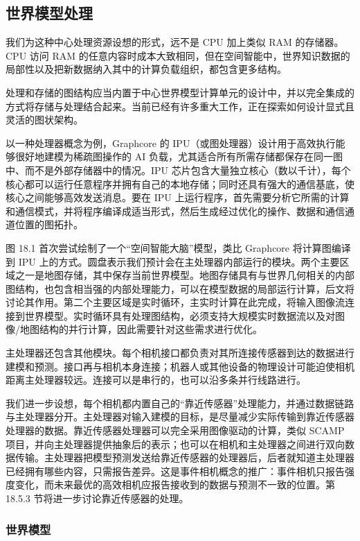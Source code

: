 \subsection{世界模型处理}

我们为这种中心处理资源设想的形式，远不是 CPU 加上类似 RAM 的存储器。CPU 访问 RAM 的任意内容时成本大致相同，但在空间智能中，世界知识数据的局部性以及把新数据纳入其中的计算负载组织，都包含更多结构。

处理和存储的图结构应当内置于中心世界模型计算单元的设计中，并以完全集成的方式将存储与处理结合起来。当前已经有许多重大工作，正在探索如何设计显式且灵活的图状架构。

以一种处理器概念为例，Graphcore 的 IPU（或图处理器）设计用于高效执行能够很好地建模为稀疏图操作的 AI 负载，尤其适合所有所需存储都保存在同一图中、而不是外部存储器中的情况。IPU 芯片包含大量独立核心（数以千计），每个核心都可以运行任意程序并拥有自己的本地存储；同时还具有强大的通信基底，使核心之间能够高效发送消息。要在 IPU 上运行程序，首先需要分析它所需的计算和通信模式，并将程序编译成适当形式，然后生成经过优化的操作、数据和通信通道位置的图拓扑。

图 18.1 首次尝试绘制了一个“空间智能大脑”模型，类比 Graphcore 将计算图编译到 IPU 上的方式。圆盘表示我们预计会在主处理器内部运行的模块。两个主要区域之一是地图存储，其中保存当前世界模型。地图存储具有与世界几何相关的内部图结构，也包含相当强的内部处理能力，可以在模型数据的局部运行计算，后文将讨论其作用。第二个主要区域是实时循环，主实时计算在此完成，将输入图像流连接到世界模型。实时循环具有处理图结构，必须支持大规模实时数据流以及对图像/地图结构的并行计算，因此需要针对这些需求进行优化。

主处理器还包含其他模块。每个相机接口都负责对其所连接传感器到达的数据进行建模和预测。接口再与相机本身连接；机器人或其他设备的物理设计可能迫使相机距离主处理器较远。连接可以是串行的，也可以沿多条并行线路进行。

我们进一步设想，每个相机都内置自己的“靠近传感器”处理能力，并通过数据链路与主处理器分开。主处理器对输入建模的目标，是尽量减少实际传输到靠近传感器处理器的数据。靠近传感器处理器可以完全采用图像驱动的计算，类似 SCAMP 项目，并向主处理器提供抽象后的表示；也可以在相机和主处理器之间进行双向数据传输。主处理器把模型预测发送给靠近传感器的处理器后，后者就知道主处理器已经拥有哪些内容，只需报告差异。这是事件相机概念的推广：事件相机只报告强度变化，而未来最优的高效相机应报告接收到的数据与预测不一致的位置。第 18.5.3 节将进一步讨论靠近传感器的处理。

\subsubsection{世界模型}

